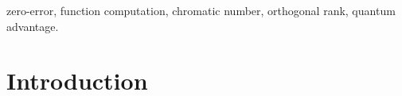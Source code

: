 \documentclass[journal, onecolumn, draftcls]{IEEEtran}
\theoremstyle{definition}
\newcommand{\meng}[1]{\marginpar{+}{\bf Ruoyu's remark}: {\em #1}}
\newcommand{\aditya}[1]{\marginpar{+}{\bf Aditya's remark}: {\em #1}}
\begin{document}
\begin{abstract}

\end{abstract}

\begin{IEEEkeywords}
zero-error, function computation, chromatic number, orthogonal rank, quantum advantage.
\end{IEEEkeywords}%

\section{Introduction }\label{sec:introduction}
\end{document}
